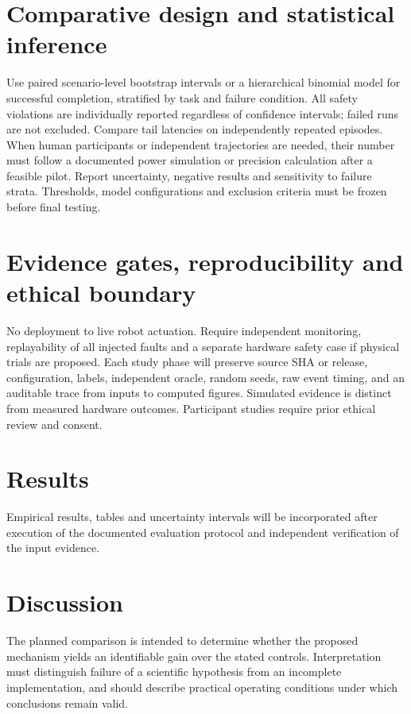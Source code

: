 \documentclass[11pt,a4paper]{article}
\begin{document}
\section{Comparative design and statistical inference}
Use paired scenario-level bootstrap intervals or a hierarchical binomial model for successful completion, stratified by task and failure condition. All safety violations are individually reported regardless of confidence intervals; failed runs are not excluded. Compare tail latencies on independently repeated episodes. When human participants or independent trajectories are needed, their number must follow a documented power simulation or precision calculation after a feasible pilot. Report uncertainty, negative results and sensitivity to failure strata. Thresholds, model configurations and exclusion criteria must be frozen before final testing.

\section{Evidence gates, reproducibility and ethical boundary}
No deployment to live robot actuation. Require independent monitoring, replayability of all injected faults and a separate hardware safety case if physical trials are proposed. Each study phase will preserve source SHA or release, configuration, labels, independent oracle, random seeds, raw event timing, and an auditable trace from inputs to computed figures. Simulated evidence is distinct from measured hardware outcomes. Participant studies require prior ethical review and consent.

\section{Results}
Empirical results, tables and uncertainty intervals will be incorporated after execution of the documented evaluation protocol and independent verification of the input evidence.

\section{Discussion}
The planned comparison is intended to determine whether the proposed mechanism yields an identifiable gain over the stated controls. Interpretation must distinguish failure of a scientific hypothesis from an incomplete implementation, and should describe practical operating conditions under which conclusions remain valid.
\end{document}
